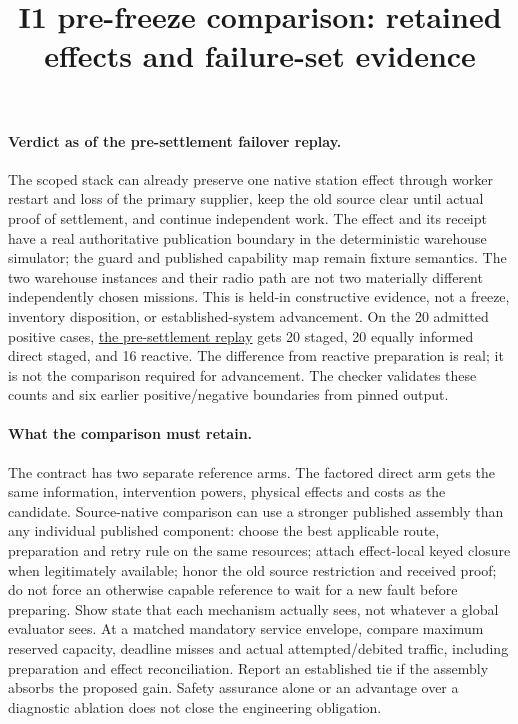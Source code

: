 \documentclass{article}
\title{I1 pre-freeze comparison: retained effects and failure-set evidence}
\begin{document}
\maketitle

\paragraph{Verdict as of the pre-settlement failover replay.}
The scoped stack can already preserve one native station effect through
worker restart and loss of the primary supplier, keep the old source
clear until actual proof of settlement, and continue independent
work. The effect and its receipt have a real authoritative publication
boundary in the deterministic warehouse simulator; the guard and published
capability map remain fixture semantics. The two warehouse instances
and their radio path are not two materially different independently
chosen missions. This is held-in constructive evidence, not a freeze,
inventory disposition, or established-system advancement. On the 20
admitted positive cases,
\href{https://github.com/eternal-november/eos-research-programmes/pull/635}{the pre-settlement replay}
gets 20 staged, 20 equally informed direct staged, and 16 reactive.
The difference from reactive preparation is real; it is not the
comparison required for advancement. The checker validates these
counts and six earlier positive/negative boundaries from pinned output.

\paragraph{What the comparison must retain.}
The contract has two separate reference arms. The factored direct arm
gets the same information, intervention powers, physical effects and
costs as the candidate. Source-native comparison can use a stronger
published assembly than any individual published component: choose
the best applicable route, preparation and retry rule on the same
resources; attach effect-local keyed closure when legitimately available;
honor the old source restriction and received proof; do not force
an otherwise capable reference to wait for a new fault before preparing.
Show state that each mechanism actually sees, not whatever a global
evaluator sees. At a matched mandatory service envelope, compare maximum
reserved capacity, deadline misses and actual attempted/debited
traffic, including preparation and effect reconciliation. Report an
established tie if the assembly absorbs the proposed gain. Safety
assurance alone or an advantage over a diagnostic ablation does not
close the engineering obligation.
\end{document}
